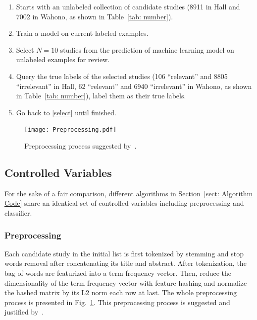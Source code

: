\documentclass{svjour3}
\theoremstyle{break}
\begin{document}
\begin{enumerate}
\item
Starts with an unlabeled collection of candidate studies (8911 in Hall and 7002 in Wahono, as shown in Table~\ref{tab: number}).

\item
\label{select}
Train a model on current labeled examples.

\item
Select $N=10$ studies from the prediction of machine learning model on unlabeled examples for review.

\item
Query the true labels of the selected studies (106 ``relevant'' and 8805 ``irrelevant'' in Hall, 62 ``relevant'' and 6940 ``irrelevant'' in Wahono, as shown in Table~\ref{tab: number}), label them as their true labels.

\item
Go back to \ref{select} until finished.

\end{enumerate}


\begin{figure}[t]
    \centering
    \texttt{[image: Preprocessing.pdf]}
    \caption{Preprocessing process suggested by~\cite{krishna2016bigse}.}
    \label{fig: preprocessing}
\end{figure}

\subsection{Controlled Variables}
\label{subsect: Controlled Variables}

For the sake of a fair comparison, different algorithms in Section~\ref{sect: Algorithm Code} share an identical set of controlled variables including preprocessing and classifier. 

\subsubsection{Preprocessing}

Each candidate study in the initial list is first tokenized by stemming and stop words removal after concatenating its title and abstract. After tokenization, the bag of words are featurized into a term frequency vector. Then, reduce the dimensionality of the term frequency vector with feature hashing and normalize the hashed matrix by its L2 norm each row at last. The whole preprocessing process is presented in Fig.~\ref{fig: preprocessing}. This preprocessing process is suggested and justified by~\cite{krishna2016bigse}.
\end{document}
